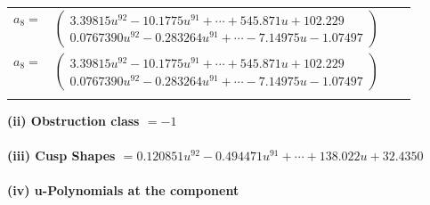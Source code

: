 \documentclass[1p]{elsarticle_modified}
\theoremstyle{definition}
\begin{document}
\begin{tabular}{m{7pt} m{180pt} m{7pt} m{180pt} }
\flushright $a_{8}=$&$\begin{pmatrix}3.39815 u^{92}-10.1775 u^{91}+\cdots+545.871 u+102.229\\0.0767390 u^{92}-0.283264 u^{91}+\cdots-7.14975 u-1.07497\end{pmatrix}$\\ \flushright $a_{8}=$&$\begin{pmatrix}3.39815 u^{92}-10.1775 u^{91}+\cdots+545.871 u+102.229\\0.0767390 u^{92}-0.283264 u^{91}+\cdots-7.14975 u-1.07497\end{pmatrix}$\\&\end{tabular}
\flushleft \textbf{(ii) Obstruction class $= -1$}\\~\\
\flushleft \textbf{(iii) Cusp Shapes $= 0.120851 u^{92}-0.494471 u^{91}+\cdots+138.022 u+32.4350$}\\~\\
\newpage\renewcommand{\arraystretch}{1}
\flushleft \textbf{(iv) u-Polynomials at the component}\newline \\
\end{document}
